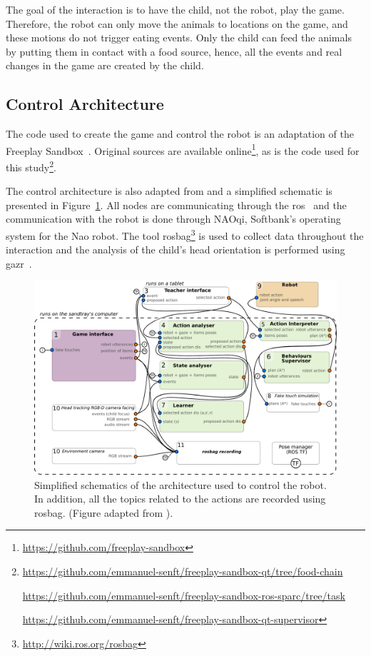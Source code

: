 The goal of the interaction is to have the child, not the robot, play the game. Therefore, the robot can only move the animals to locations on the game, and these motions do not trigger eating events. Only the child can feed the animals by putting them in contact with a food source, hence, all the events and real changes in the game are created by the child. 

\subsection{Control Architecture}\label{sec:tuto_arch}

The code used to create the game and control the robot is an adaptation of the Freeplay Sandbox~\citep{lemaignan2018pinsoro}. Original sources are available online\footnote{\url{https://github.com/freeplay-sandbox}}, as is the code used for this study\footnote{\url{https://github.com/emmanuel-senft/freeplay-sandbox-qt/tree/food-chain}
	
\url{https://github.com/emmanuel-senft/freeplay-sandbox-ros-sparc/tree/task}
	
\url{https://github.com/emmanuel-senft/freeplay-sandbox-qt-supervisor}}.

The control architecture is also adapted from \cite{lemaignan2018pinsoro} and a simplified schematic is presented in Figure~\ref{fig:tutoring_arch}. All nodes are communicating through the \gls{ros}~\citep{quigley2009ros} and the communication with the robot is done through NAOqi, Softbank's operating system for the Nao robot. The tool rosbag\footnote{\url{http://wiki.ros.org/rosbag}} is used to collect data throughout the interaction and the analysis of the child's head orientation is performed using gazr~\citep{lemaignan2016real}.

\begin{figure}[ht]
	\centering
	\includegraphics[width=1\textwidth]{architecture.pdf}
	\caption{Simplified schematics of the architecture used to control the robot. In addition, all the topics related to the actions are recorded using rosbag. (Figure adapted from \citealt{lemaignan2018pinsoro}).}
	\label{fig:tutoring_arch}
\end{figure}

